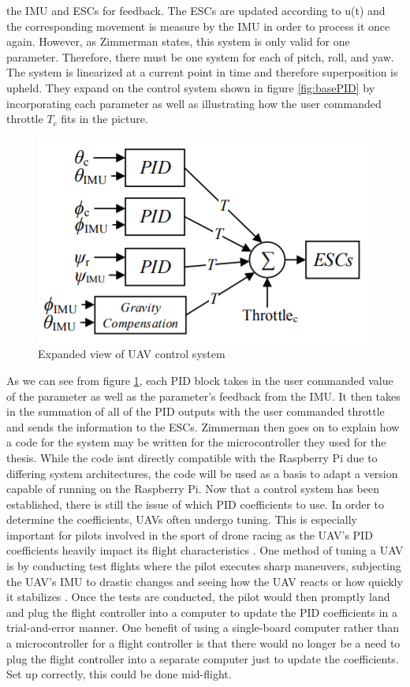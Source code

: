 \documentclass[english]{upeeei}
\begin{document}
the IMU and ESCs for feedback. The ESCs are updated according to u(t) and the corresponding movement is measure by the IMU in order to process it
once again. However, as Zimmerman states, this system is only valid for one parameter. Therefore, there must be one system for each of pitch, roll, 
and yaw. The system is linearized at a current point in time and therefore superposition is upheld. They expand on the control system shown in 
figure \ref{fig:basePID} by incorporating each parameter as well as illustrating how the user commanded throttle $T_c$ fits in the picture. 
\begin{figure}[h]
    \centering
    \includegraphics[scale=0.65]{images/controlSysExpanded.PNG}
    \caption{Expanded view of UAV control system \cite{zimmerman2016}}
    \label{fig:expandedPID}
\end{figure}
As we can see from figure \ref{fig:expandedPID}, each PID block takes in the user commanded value of the parameter as well as the parameter's
feedback from the IMU. It then takes in the summation of all of the PID outputs with the user commanded throttle and sends the information to the
ESCs. Zimmerman then goes on to explain how a code for the system may be written for the microcontroller they used for the thesis. While the code
isnt directly compatible with the Raspberry Pi due to differing system architectures, the code will be used as a basis to adapt a version capable
of running on the Raspberry Pi.
\newline
\newline
Now that a control system has been established, there is still the issue of which PID coefficients to use. In order to determine the coefficients,
UAVs often undergo tuning. This is especially important for pilots involved in the sport of drone racing as the UAV's PID coefficients heavily
impact its flight characteristics \cite{Dowling2018}. One method of tuning a UAV is by conducting test flights where the pilot executes sharp
maneuvers, subjecting the UAV's IMU to drastic changes and seeing how the UAV reacts or how quickly it stabilizes \cite{Tuning2017}. Once the tests
are conducted, the pilot would then promptly land and plug the flight controller into a computer to update the PID coefficients in a trial-and-error
manner. One benefit of using a single-board computer rather than a microcontroller for a flight controller is that there would no longer be a need
to plug the flight controller into a separate computer just to update the coefficients. Set up correctly, this could be done mid-flight.
\end{document}
